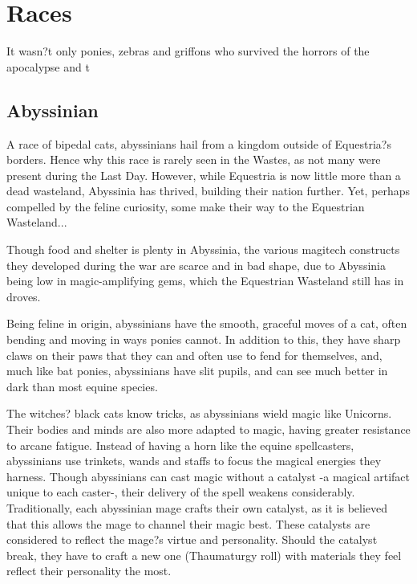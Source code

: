 \documentclass[11pt,a4paper,twocolumn]{book}
\begin{document}
	\chapter{Races}
	
	It wasn?t only ponies, zebras and griffons who survived the horrors of the apocalypse and t

	\section*{Abyssinian}
	A race of bipedal cats, abyssinians hail from a kingdom outside of Equestria?s borders. Hence why this race is rarely seen in the Wastes, as not many were present during the Last Day. However, while Equestria is now little more than a dead wasteland, Abyssinia has thrived, building their nation further. Yet, perhaps compelled by the feline curiosity, some make their way to the Equestrian Wasteland... 
	
	Though food and shelter is plenty in Abyssinia, the various magitech constructs they developed during the war are scarce and in bad shape, due to Abyssinia being low in magic-amplifying gems, which the Equestrian Wasteland still has in droves.
	
	Being feline in origin, abyssinians have the smooth, graceful moves of a cat, often bending and moving in ways ponies cannot. In addition to this, they have sharp claws on their paws that they can and often use to fend for themselves, and, much like bat ponies, abyssinians have slit pupils, and can see much better in dark than most equine species.
	
	The witches? black cats know tricks, as abyssinians wield magic like Unicorns. Their bodies and minds are also more adapted to magic, having greater resistance to arcane fatigue. 
	Instead of having a horn like the equine spellcasters, abyssinians use trinkets, wands and staffs to focus the magical energies they harness. Though abyssinians can cast magic without a catalyst -a magical artifact unique to each caster-, their delivery of the spell weakens considerably. 
	Traditionally, each abyssinian mage crafts their own catalyst, as it is believed that this allows the mage to channel their magic best. These catalysts are considered to reflect the mage?s virtue and personality. Should the catalyst break, they have to craft a new one (Thaumaturgy roll) with materials they feel reflect their personality the most.
	
\end{document}
